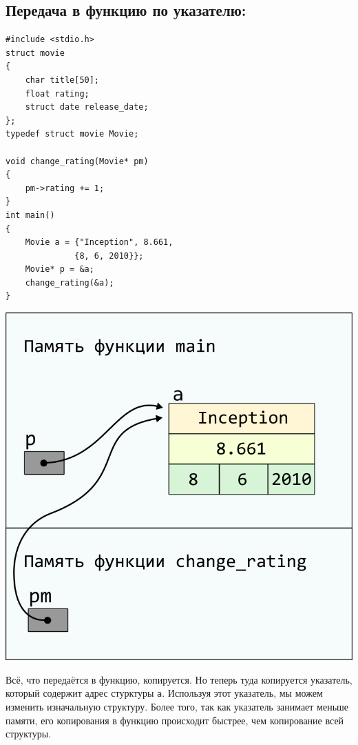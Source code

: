 \documentclass{article}
\begin{document}
\subsection*{Передача в функцию по указателю:}
\begin{multicols}{2}
\begin{lstlisting}
#include <stdio.h>
struct movie 
{
    char title[50];
    float rating;
    struct date release_date;
};
typedef struct movie Movie;

void change_rating(Movie* pm) 
{
    pm->rating += 1;
}
int main() 
{
    Movie a = {"Inception", 8.661, 
              {8, 6, 2010}};
    Movie* p = &a;
    change_rating(&a);
}
\end{lstlisting}
\columnbreak
\begin{center}
\includegraphics[scale=0.86]{../images/pointer_schemes/function_by_pointer.png}
\end{center}
\end{multicols}
Всё, что передаётся в функцию, копируется. Но теперь туда копируется указатель, который содержит
адрес стурктуры \texttt{a}. Используя этот указатель, мы можем изменить изначальную структуру. Более того, так как указатель занимает меньше памяти, его копирования в функцию происходит быстрее, чем копирование всей структуры.
\end{document}
